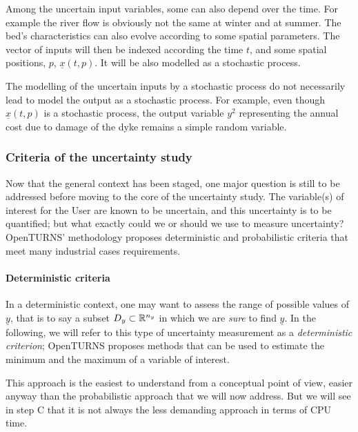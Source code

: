 Among the uncertain input variables, some can also depend over the time. For example the river flow is obviously not the same at winter and at summer.
The bed's characteristics can also evolve according to some spatial parameters. The vector of inputs will then be indexed according the time $t$, and some spatial positions, $p$,
$\underline{x}(t,p)$. It will be also modelled as a stochastic process.

The modelling of the uncertain inputs by a stochastic process do not necessarily lead to model the output as a stochastic process. For example, even though $\underline{x}(t,p)$ is a stochastic process, the output variable $y^2$ representing the annual cost due to damage of the dyke remains a simple random variable.

\subsubsection{Criteria of the uncertainty study}

Now that the general context has been staged, one major question is still to be addressed before moving to the core of the uncertainty study. The variable(s) of interest for the User are known to be uncertain, and this uncertainty is to be quantified; but what exactly could we or should we use to measure uncertainty? OpenTURNS' methodology proposes deterministic and probabilistic criteria that meet many industrial cases requirements.



\paragraph{Deterministic criteria}
\par

In a deterministic context, one may want to assess the range of possible values of $\underline{y}$, that is to say a subset $D_y \subset {\mathbb R}^{n_y}$ in which we are {\em sure} to find $\underline{y}$. In the following, we will refer to this type of uncertainty measurement as a {\em deterministic criterion}; OpenTURNS proposes methods that can be used to estimate the minimum and the maximum of a variable of interest.

This approach is the easiest to understand from a conceptual point of view, easier anyway than the probabilistic approach that we will now address. But we will see in step C that it is not always the less demanding approach in terms of CPU time.

